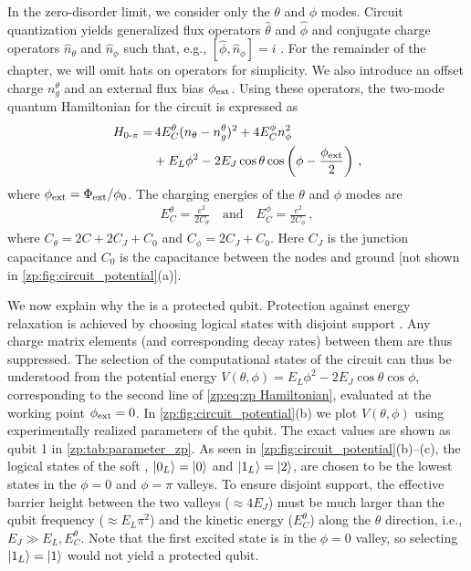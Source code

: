 In the zero-disorder limit, we consider only the $\theta$ and $\phi$ modes.
Circuit quantization yields generalized flux operators  $\hat{\theta}$ and $\hat{\phi}$ and conjugate charge operators $\hat{n}_{\theta}$ and $\hat{n}_{\phi}$ such that, e.g., $[\hat{\phi}, \hat{n}_\phi] = i$ \cite{Dempster2014understanding}.
For the remainder of the chapter, we will omit hats on operators for simplicity.
We also introduce an offset charge $n_g^{\theta}$ and an external flux bias $\phi_{\rm ext}$.
Using these operators, the two-mode quantum Hamiltonian for the \zps circuit is expressed as
\begin{align} \label{zp:eq:zp Hamiltonian}
\begin{split}
    H_{0\text{-}\pi} =&\, 4E_C^\theta ({n}_{\theta}-n_g^{\theta})^2 + 4E_C^\phi {n}_{\phi}^2 \\
    &+ E_L {\phi} ^2  - 2 E_J \cos{\theta} \cos\left({\phi} -\frac{\phi_{\rm ext}}{2}\right) \,,
\end{split}
\end{align}
where $\phi_{\rm ext} = \Phi_{\rm ext}/\phi_0$.
The charging energies of the $\theta$ and $\phi$ modes are
\begin{align}
    E_C^\theta = \frac{e^2}{2C_\theta} \quad \text{and} \quad
    E_C^\phi  = \frac{e^2}{2C_\phi}  \, ,
\end{align}
where $C_\theta =2C +2C_J +C_0$ and $C_\phi = 2C_J +C_0$.
Here $C_J$ is the junction capacitance and $C_0$ is the capacitance between the nodes and ground [not shown in \cref{zp:fig:circuit_potential}(a)].

We now explain why the \zps is a protected qubit.
Protection against energy relaxation is achieved by choosing logical states with disjoint support \cite{gyenisMovingTransmonNoiseProtected2021b}.
Any charge matrix elements (and corresponding decay rates) between them are thus suppressed.
The selection of the computational states of the \zps circuit can thus be understood from the potential energy $V(\theta, \phi) = E_L \phi^2 - 2 E_J \cos\theta \cos\phi$, corresponding to the second line of \cref{zp:eq:zp Hamiltonian}, evaluated at the working point $\phi_{\rm ext} = 0$.
In \cref{zp:fig:circuit_potential}(b) we plot $V(\theta, \phi)$ using experimentally realized parameters of the \zps qubit.
The exact values are shown as qubit 1 in \cref{zp:tab:parameter_zp}.
As seen in \cref{zp:fig:circuit_potential}(b)--(c), the logical states of the soft \zp, $\ket{0_L}=\ket{0}$ and $\ket{1_L}=\ket{2}$, are chosen to be the lowest states in the $\phi=0$ and $\phi=\pi$ valleys.
To ensure disjoint support, the effective barrier height between the two valleys ($\approx 4E_J$) must be much larger than the qubit frequency ($\approx E_L \pi^2$) and the kinetic energy ($E_C^{\theta}$) along the $\theta$ direction, i.e., $E_J\gg E_L, E_C^{\theta}$.
Note that the first excited state is in the $\phi=0$ valley, so selecting $\ket{1_L} = \ket{1}$ would not yield a protected qubit.

